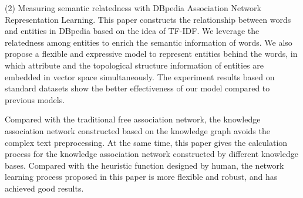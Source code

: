 \begin{englishabstract}
    (2) Measuring semantic relatedness with DBpedia Association Network Representation Learning. This paper constructs the relationship between words and entities in DBpedia based on the idea of TF-IDF. We leverage the relatedness among entities to enrich the semantic information of words. We also propose a flexible and expressive model to represent entities behind the words, in which attribute and the topological structure information of entities are embedded in vector space simultaneously. The experiment results based on standard datasets show the better effectiveness of our model compared to previous models.

    Compared with the traditional free association network, the knowledge association network constructed based on the knowledge graph avoids the complex text preprocessing. At the same time, this paper gives the calculation process for the knowledge association network constructed by different knowledge bases. Compared with the heuristic function designed by human, the network learning process proposed in this paper is more flexible and robust, and has achieved good results.


\end{englishabstract}

%

\ensoochowauthor{~*~\quad }

\ensoochowtutor{*\quad}
